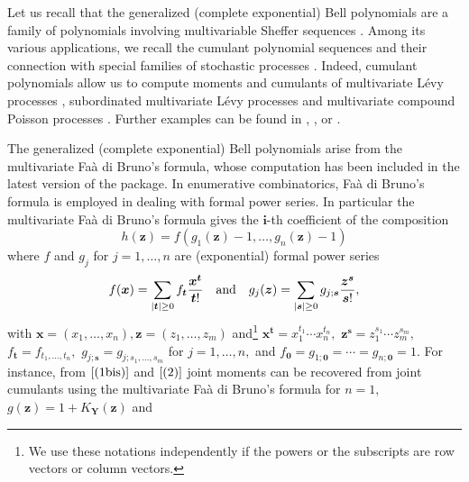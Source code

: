 Let us recall that the generalized (complete exponential) Bell
polynomials are a family of polynomials involving multivariable Sheffer
sequences \citep{MR538226}. Among its various applications, we recall
the cumulant polynomial sequences and their connection with special
families of stochastic processes \citep{MR3529335}. Indeed, cumulant
polynomials allow us to compute moments and cumulants of multivariate
Lévy processes \citep{AIP}, subordinated multivariate Lévy processes
\citep{MR4129101} and multivariate compound Poisson processes
\citep{MR3412229}. Further examples can be found in \citet{MR505584},
\citet{MR1915279}, \citet{MR2725499} or \citet{PRIVAULT2021109161}.

The generalized (complete exponential) Bell polynomials arise from the
multivariate Faà di Bruno's formula, whose computation has been included
in the latest version of the  package. In
enumerative combinatorics, Faà di Bruno's formula is employed in dealing
with formal power series. In particular the multivariate Faà di Bruno's
formula gives the \(\boldsymbol{i}\)-th coefficient of the composition
\citep{MR2773373} \begin{equation}
h(\boldsymbol{z}) = f\left(g_1(\boldsymbol{z})-1, \ldots,g_n(\boldsymbol{z})-1\right)
\label{mfaa1}
\end{equation} where \(f\) and \(g_j\) for \(j=1, \ldots, n\) are
(exponential) formal power series \begin{equation} \label{multps1}
f(\boldsymbol{x})= \sum_{|\boldsymbol{t}| \geq 0} f_{\boldsymbol{t}} \frac{\boldsymbol{x}^{\boldsymbol{t}}}{\boldsymbol{t}!}
\quad \hbox{and} \quad 
g_j(\boldsymbol{z}) = \sum_{|\boldsymbol{s}| \geq 0} g_{j; \boldsymbol{s}} \frac{\boldsymbol{z}^{\boldsymbol{s}}}{\boldsymbol{s}!}, 
\end{equation} with
\(\boldsymbol{x}=(x_1, \ldots, x_n),\boldsymbol{z}=(z_1, \ldots, z_m)\)
and\footnote{We use these notations independently if the powers or the
  subscripts are row vectors or column vectors.}
\(\boldsymbol{x}^{\boldsymbol{t}} = x_1^{t_1} \cdots x_n^{t_n},\)
\({\boldsymbol{z}}^{\boldsymbol{s}} = z_1^{s_1} \cdots z_m^{s_m},\)
\(f_{\boldsymbol{t}} = f_{t_1, \ldots, t_n},\)
\(g_{j; \boldsymbol{s}} = g_{j; s_1, \ldots, s_m}\) for
\(j=1,\ldots,n,\) and
\(f_{\boldsymbol{0}}=g_{1; \boldsymbol{0}}= \cdots = g_{n; \boldsymbol{0}}=1.\)
For instance, from \(\eqref{(1bis)}\) and \(\eqref{(2)}\) joint moments
can be recovered from joint cumulants using the multivariate Faà di
Bruno's formula for \(n=1,\)
\(g(\boldsymbol{z}) = 1 + K_{\boldsymbol{Y}}(\boldsymbol{z})\) and
